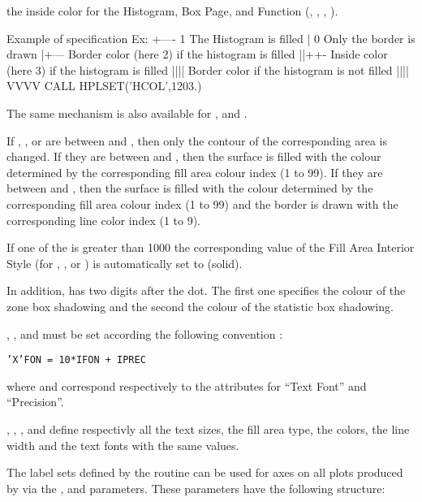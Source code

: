 \begin{UL}
      the inside color for the Histogram, Box Page, and Function (, 
      , , ).
      \begin{XMPt}{Example of  specification}
      Ex:
                    +---- 1 The Histogram is filled
                    |     0 Only the border is drawn 
                    |+--- Border color (here 2) if the histogram is filled
                    ||++- Inside color (here 3) if the histogram is filled
                    ||||  Border color if the histogram is not filled
                    ||||
                    VVVV
 CALL HPLSET('HCOL',1203.)
      \end{XMPt}
The same mechanism is also available for ,  and 
.

If , ,  or  are between 
and , then only the contour of the corresponding area is changed. 
If they are between  and , then the surface is filled with
the colour determined by the corresponding fill area colour index (1 to 99).
If they are between  and , then the surface is filled with
the colour determined by the corresponding fill area colour index (1 to 99)
and the border is drawn with the corresponding line color index (1 to 9).

If one of the  is greater than 1000 the corresponding value of the
Fill Area Interior Style (for , ,  or 
) is automatically set to  (solid).

In addition,  has two digits after the dot. The first one specifies
the colour of the zone box shadowing and the second the colour
of the statistic box shadowing. 
\item {}, ,  and  must be set 
      according the following convention :
            \begin{center}
            \tt 'X'FON = 10*IFON + IPREC
            \end{center}
      where  and  correspond respectively to the \HIGZ{} 
      attributes for ``Text Font'' and ``Precision''.
\item {}, , ,  and  define 
      respectivly all the text sizes, the fill area type, the colors, the line 
      width and the text fonts with the same values.
\item The label sets defined by the routine  can be used for axes 
      on all plots produced by \HPLOT{} via the ,  and 
       parameters. These parameters have the following structure:
 

\end{UL}
